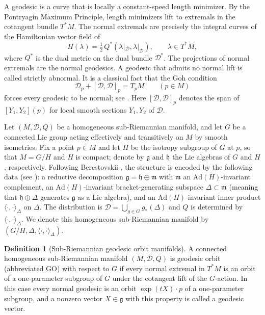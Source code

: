 \documentclass[12pt]{amsart}
\theoremstyle{plain}
\theoremstyle{definition}
\newtheorem{definition}{Definition}[section]
\theoremstyle{remark}
\begin{document}
A geodesic is a curve that is locally a constant-speed length minimizer. By the Pontryagin Maximum
Principle, length minimizers lift to extremals in the cotangent bundle $T^*M$. The normal
extremals are precisely the integral curves of the Hamiltonian vector field of
\begin{equation}\label{eq:ham}
H(\lambda)=\tfrac12\,Q^{*}(\lambda|_{\mathcal{D}},\lambda|_{\mathcal{D}}),\qquad \lambda\in T^*M,
\end{equation}
where $Q^{*}$ is the dual metric on the dual bundle $\mathcal{D}^{*}$. The projections of normal
extremals are the normal geodesics. A geodesic that admits no normal lift is called
strictly abnormal. It is a classical fact that the Goh condition
\begin{equation}\label{eq:goh}
\mathcal{D}_p+[\mathcal{D},\mathcal{D}]_p=T_pM\qquad(p\in M)
\end{equation}
forces every geodesic to be normal; see \cite[Corollary 12.14]{Agrachev}. Here
$[\mathcal{D},\mathcal{D}]_p$ denotes the span of $[Y_1,Y_2](p)$ for local smooth sections
$Y_1,Y_2$ of $\mathcal{D}$.

Let $(M,\mathcal{D},Q)$ be a homogeneous sub-Riemannian manifold, and let $G$ be a connected Lie
group acting effectively and transitively on $M$ by smooth isometries. Fix a point $p\in M$ and
let $H$ be the isotropy subgroup of $G$ at $p$, so that $M=G/H$ and $H$ is compact; denote by
$\mathfrak{g}$ and $\mathfrak{h}$ the Lie algebras of $G$ and $H$, respectively. Following
Berestovskii \cite{Berestovskii}, the structure is encoded by the following data (see
\cite{Berestovskii,YAD}): a reductive decomposition $\mathfrak{g}=\mathfrak{h}\oplus\mathfrak{m}$
with $\mathfrak{m}$ an $\mathrm{Ad}(H)$-invariant complement, an $\mathrm{Ad}(H)$-invariant
bracket-generating subspace $\Delta\subset\mathfrak{m}$ (meaning that $\mathfrak{h}\oplus\Delta$
generates $\mathfrak{g}$ as a Lie algebra), and an $\mathrm{Ad}(H)$-invariant inner product
$\langle\cdot,\cdot\rangle_\Delta$ on $\Delta$. The distribution is
$\mathcal{D}=\bigcup_{g\in G}g_*(\Delta)$ and $Q$ is determined by $\langle\cdot,\cdot\rangle_\Delta$.
We denote this homogeneous sub-Riemannian manifold by
$(G/H,\Delta,\langle\cdot,\cdot\rangle_\Delta)$.

\begin{definition}[Sub-Riemannian geodesic orbit manifolds]\label{def:GO}
A connected homogeneous sub-Riemannian manifold $(M,\mathcal{D},Q)$ is geodesic orbit
(abbreviated GO) with respect to $G$ if every normal extremal in $T^*M$ is an orbit of a
one-parameter subgroup of $G$ under the cotangent lift of the $G$-action. In this case every
normal geodesic is an orbit $\exp(tX)\cdot p$ of a one-parameter subgroup, and a nonzero vector
$X\in\mathfrak{g}$ with this property is called a geodesic vector.
\end{definition}
\end{document}
